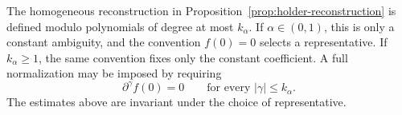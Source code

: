 {}
{}

\begin{remark}
  \label{rmk:homogeneous-reconstruction-representative}The homogeneous
  reconstruction in  Proposition~\ref{prop:holder-reconstruction} is defined
  modulo polynomials of degree at most $k_{\alpha}$. If $\alpha \in (0, 1)$,
  this is only a constant ambiguity, and the convention $f (0) = 0$ selects a
  representative. If $k_{\alpha} \ge 1$, the same convention fixes only the
  constant coefficient. A full normalization may be imposed by requiring
  \[ \partial^{\gamma} f (0) = 0 \qquad \text{for every } | \gamma | \le
     k_{\alpha} . \]
  The estimates above are invariant under the choice of representative.
\end{remark}

